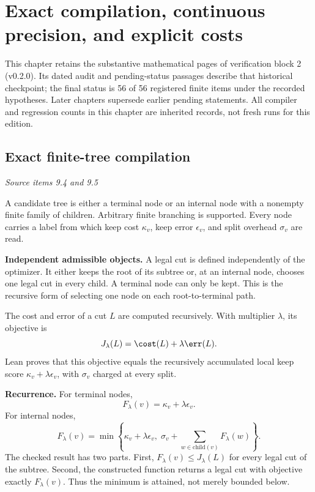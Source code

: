 \clearpage\FloatBarrier\section{Exact compilation, continuous precision, and explicit costs}\label{supp2:section:001}
This chapter retains the substantive mathematical pages of verification block 2 (v0.2.0). Its dated audit and pending-status passages describe that historical checkpoint; the final status is 56 of 56 registered finite items under the recorded hypotheses. Later chapters supersede earlier pending statements. All compiler and regression counts in this chapter are inherited records, not fresh runs for this edition.\par

\subsection{Exact finite-tree compilation}\label{supp2:subsection:001}\textit{Source items 9.4 and 9.5}\par
A candidate tree is either a terminal node or an internal node with a nonempty finite family of children. Arbitrary finite branching is supported. Every node carries a label from which keep cost $\kappa_v$, keep error $\epsilon_v$, and split overhead $\sigma_v$ are read.

\textbf{Independent admissible objects.} A legal cut is defined independently of the optimizer. It either keeps the root of its subtree or, at an internal node, chooses one legal cut in every child. A terminal node can only be kept. This is the recursive form of selecting one node on each root-to-terminal path.

The cost and error of a cut $L$ are computed recursively. With multiplier $\lambda$, its objective is
\[
J_\lambda(L)=\cost(L)+\lambda\err(L).
\]
Lean proves that this objective equals the recursively accumulated local keep score $\kappa_v+\lambda\epsilon_v$, with $\sigma_v$ charged at every split.

\textbf{Recurrence.} For terminal nodes,
\[
F_\lambda(v)=\kappa_v+\lambda\epsilon_v.
\]
For internal nodes,
\[
\boxed{F_\lambda(v)=\min\left\{\kappa_v+\lambda\epsilon_v,
\;\sigma_v+\sum_{w\in\mathrm{child}(v)}F_\lambda(w)\right\}.}
\]
The checked result has two parts. First, $F_\lambda(v)\leq J_\lambda(L)$ for every legal cut of the subtree. Second, the constructed function  returns a legal cut with objective exactly $F_\lambda(v)$. Thus the minimum is attained, not merely bounded below.

